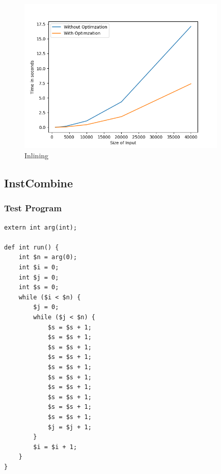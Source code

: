 \documentclass[letter,11pt]{article}
\begin{document}
\begin{figure}[H]
	\centering
	\includegraphics[width=10cm]{timing/1.png}
	\caption{Inlining}
	\label{fig:inlining}
\end{figure}


\subsection*{InstCombine}

\subsubsection*{Test Program}

\begin{verbatim}
extern int arg(int);

def int run() {
    int $n = arg(0);
    int $i = 0;
    int $j = 0;
    int $s = 0;
    while ($i < $n) {
        $j = 0;
        while ($j < $n) {
            $s = $s + 1;
            $s = $s + 1;
            $s = $s + 1;
            $s = $s + 1;
            $s = $s + 1;
            $s = $s + 1;
            $s = $s + 1;
            $s = $s + 1;
            $s = $s + 1;
            $s = $s + 1;
            $j = $j + 1;
        }
        $i = $i + 1;
    }
}
\end{verbatim}
\end{document}
